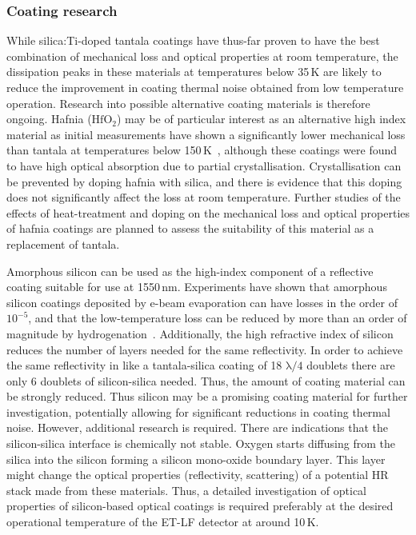 \FloatBarrier
\subsubsection{Coating research}
\label{sec:coating_RND}

While silica:Ti-doped tantala coatings have thus-far proven to have the best combination of mechanical loss and optical properties at room temperature, the dissipation peaks in these materials at temperatures below 35\,K are likely to reduce the improvement in coating thermal noise obtained from low temperature operation. Research into possible alternative coating materials is therefore ongoing. Hafnia ($\mathrm{HfO_2}$) may be of particular interest as an alternative high index material as initial measurements have shown a significantly lower mechanical loss than tantala at temperatures below 150\,K~\cite{abernathy11,chalkley10}, although these coatings were found to have high optical absorption due to partial crystallisation. Crystallisation can be prevented by doping hafnia with silica, and there is evidence that this doping does not significantly affect the loss at room temperature. Further studies of the effects of heat-treatment and doping on the mechanical loss and optical properties of hafnia coatings are planned to assess the suitability of this material as a replacement of tantala.

Amorphous silicon can be used as the high-index component of a reflective coating suitable for use at 1550\,nm. Experiments have shown that amorphous silicon coatings deposited by e-beam evaporation can have losses in the order of $10^{-5}$, and that the low-temperature loss can be reduced by more than an order of magnitude by hydrogenation~\cite{liu98}. Additionally, the high refractive index of silicon reduces the number of layers needed for the same reflectivity. In order to achieve the same reflectivity in like a tantala-silica coating of 18 $\mathrm{\lambda/4}$ doublets there are only 6 doublets of silicon-silica needed. Thus, the amount of coating material can be strongly reduced. Thus silicon may be a promising coating material for further investigation, potentially allowing for significant reductions in coating thermal noise. However, additional research is required. There are indications that the silicon-silica interface is chemically not stable. Oxygen starts diffusing from the silica into the silicon forming a silicon mono-oxide boundary layer. This layer might change the optical properties (reflectivity, scattering) of a potential HR stack made from these materials. Thus, a detailed investigation of optical properties of silicon-based optical coatings is required preferably at the desired operational temperature of the ET-LF detector at around 10\,K.


